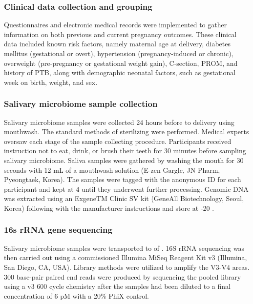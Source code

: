 \documentclass[11pt, a4paper, onecolumn, oneside]{report}
\begin{document}
            \subsubsection{Clinical data collection and grouping}
                Questionnaires and electronic medical records were implemented to gather information on both previous and current pregnancy outcomes. These clinical data included known risk factors, namely maternal age at delivery, diabetes mellitus (gestational or overt), hypertension (pregnancy-induced or chronic), overweight (pre-pregnancy or gestational weight gain), C-section, PROM, and history of PTB, along with demographic neonatal factors, such as gestational week on birth, weight, and sex.

            \subsubsection{Salivary microbiome sample collection}
                Salivary microbiome samples were collected 24 hours before to delivery using mouthwash. The standard methods of sterilizing were performed. Medical experts oversaw each stage of the sample collecting procedure. Participants received instruction not to eat, drink, or brush their teeth for 30 minutes before sampling salivary microbiome. Saliva samples were gathered by washing the mouth for 30 seconds with 12 mL of a mouthwash solution (E-zen Gargle, JN Pharm, Pyeongtaek, Korea). The samples were tagged with the anonymous ID for each participant and kept at 4 \textcelsius until they underwent further processing. Genomic DNA was extracted using an ExgeneTM Clinic SV kit (GeneAll Biotechnology, Seoul, Korea) following with the manufacturer instructions and store at -20 \textcelsius.

            \subsubsection{16s rRNA gene sequencing}
                Salivary microbiome samples were transported to  of . 16S rRNA sequencing was then carried out using a commissioned Illumina MiSeq Reagent Kit v3 (Illumina, San Diego, CA, USA). Library methods were utilized to amplify the V3-V4 areas. 300 base-pair paired end reads were produced by sequencing the pooled library using a v3 600 cycle chemistry after the samples had been diluted to a final concentration of 6 pM with a 20\% PhiX control.
\end{document}
